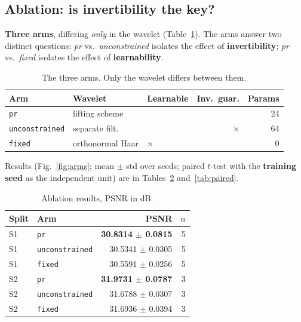 \documentclass[conference]{IEEEtran}
\begin{document}
\subsection{Ablation: is invertibility the key?}
\label{sec:ablation}

\textbf{Three arms}, differing \emph{only} in the wavelet
(Table~\ref{tab:arms}). The arms answer two distinct questions: \emph{pr} vs.\
\emph{unconstrained} isolates the effect of \textbf{invertibility}; \emph{pr}
vs.\ \emph{fixed} isolates the effect of \textbf{learnability}.

\begin{table}[t]
\centering
\caption{The three arms. Only the wavelet differs between them.}
\label{tab:arms}
\small
\begin{tabular}{@{}lllrr@{}}
\toprule
Arm & Wavelet & Learnable & Inv.\ guar. & Params\\
\midrule
\texttt{pr} & lifting scheme & \checkmark & \textbf{\checkmark} & 24\\
\texttt{unconstrained} & separate filt. & \checkmark & $\times$ & 64\\
\texttt{fixed} & orthonormal Haar & $\times$ & \checkmark & 0\\
\bottomrule
\end{tabular}
\end{table}

Results (Fig.~\ref{fig:arms}; mean $\pm$ std over seeds; paired $t$-test with the
\textbf{training seed} as the independent unit) are in Tables~\ref{tab:arms-res}
and~\ref{tab:paired}.

\begin{table}[t]
\centering
\caption{Ablation results, PSNR in dB.}
\label{tab:arms-res}
\small
\begin{tabular}{@{}llrr@{}}
\toprule
Split & Arm & PSNR & $n$\\
\midrule
S1 & \texttt{pr} & \textbf{30.8314 $\pm$ 0.0815} & 5\\
S1 & \texttt{unconstrained} & 30.5341 $\pm$ 0.0305 & 5\\
S1 & \texttt{fixed} & 30.5591 $\pm$ 0.0256 & 5\\
\midrule
S2 & \texttt{pr} & \textbf{31.9731 $\pm$ 0.0787} & 3\\
S2 & \texttt{unconstrained} & 31.6788 $\pm$ 0.0307 & 3\\
S2 & \texttt{fixed} & 31.6936 $\pm$ 0.0394 & 3\\
\bottomrule
\end{tabular}
\end{table}
\end{document}
